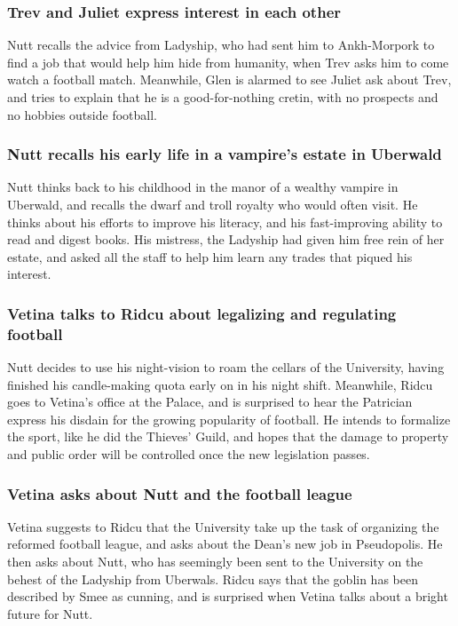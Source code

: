 \subsubsection{\Gls{Trev} and \Gls{Juliet} express interest in each other}
\Gls{Nutt} recalls the advice from \Gls{Ladyship}, who had sent him to Ankh-Morpork to find a job
that would help him hide from humanity, when \Gls{Trev} asks him to come watch a football match.
Meanwhile, \Gls{Glen} is alarmed to see \Gls{Juliet} ask about \Gls{Trev}, and tries to explain
that he is a good-for-nothing cretin, with no prospects and no hobbies outside football.

\subsubsection{\Gls{Nutt} recalls his early life in a vampire's estate in Uberwald}
\Gls{Nutt} thinks back to his childhood in the manor of a wealthy vampire in Uberwald, and recalls
the dwarf and troll royalty who would often visit. He thinks about his efforts to improve his
literacy, and his fast-improving ability to read and digest books. His mistress, the \Gls{Ladyship}
had given him free rein of her estate, and asked all the staff to help him learn any trades that
piqued his interest.

\subsubsection{\Gls{Vetina} talks to \Gls{Ridcu} about legalizing and regulating football}
\Gls{Nutt} decides to use his night-vision to roam the cellars of the University, having finished
his candle-making quota early on in his night shift. Meanwhile, \Gls{Ridcu} goes to \Gls{Vetina}'s
office at the Palace, and is surprised to hear the Patrician express his disdain for the growing
popularity of football. He intends to formalize the sport, like he did the Thieves' Guild, and
hopes that the damage to property and public order will be controlled once the new legislation
passes.

\subsubsection{\Gls{Vetina} asks about \Gls{Nutt} and the football league}
\Gls{Vetina} suggests to \Gls{Ridcu} that the University take up the task of organizing the reformed
football league, and asks about the \Gls{Dean}'s new job in Pseudopolis. He then asks about
\Gls{Nutt}, who has seemingly been sent to the University on the behest of the \Gls{Ladyship} from
Uberwals. \Gls{Ridcu} says that the goblin has been described by \Gls{Smee} as cunning, and is
surprised when \Gls{Vetina} talks about a bright future for \Gls{Nutt}.

